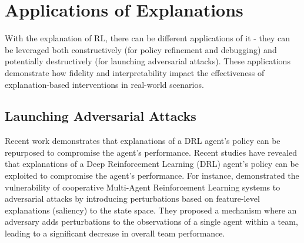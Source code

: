\section{Applications of Explanations}
With the explanation of RL, there can be different applications of it - they can be leveraged both constructively (for policy refinement and debugging) and potentially destructively (for launching adversarial attacks). These applications demonstrate how fidelity and interpretability impact the effectiveness of explanation-based interventions in real-world scenarios.


\begin{table*}[ht]
\centering
{}
\caption{Taxonomy of Explanation-based Interventions in DRL.}
\label{tab:taxonomy}
\end{table*}



\subsection{Launching Adversarial Attacks}
Recent work demonstrates that explanations of a DRL agent's policy can be repurposed to compromise the agent's performance. Recent studies have revealed that explanations of a Deep Reinforcement Learning (DRL) agent's policy can be exploited to compromise the agent's performance. For instance, \citet{lin2020robustness} demonstrated the vulnerability of cooperative Multi-Agent Reinforcement Learning systems to adversarial attacks by introducing perturbations based on feature-level explanations (\ie saliency) to the state space. They proposed a mechanism where an adversary adds perturbations to the observations of a single agent within a team, leading to a significant decrease in overall team performance. 


